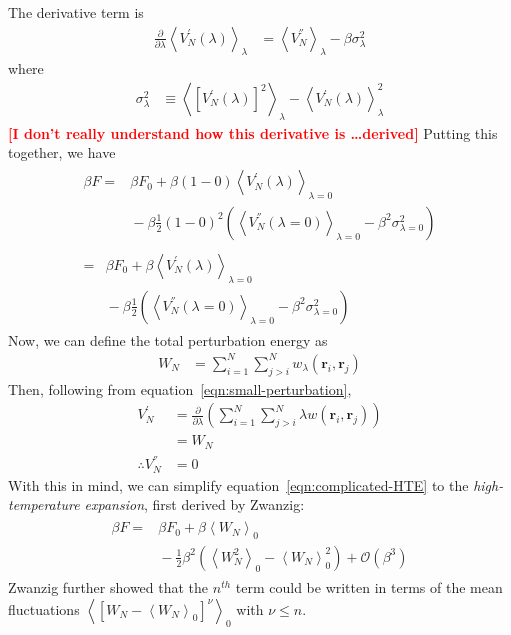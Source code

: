 \documentclass[letterpaper,twocolumn,amsmath,amssymb,prb]{revtex4-1}
\newcommand{\1}{\ensuremath{\textbf{r}_1}}
\newcommand{\2}{\ensuremath{\textbf{r}_2}}
\newcommand{\3}{\ensuremath{\textbf{r}_3}}
\newcommand{\4}{\ensuremath{\textbf{r}_4}}
\newcommand{\fixme}[1]{\textcolor{red}{\textbf{[#1]}}}
\begin{document}
The derivative term is
\begin{align}
  \frac{\partial}{\partial\lambda}\left\langle V_N^{'}(\lambda) \right\rangle_{\lambda} &= \left\langle V_N^{''} \right\rangle_\lambda - \beta\sigma_\lambda^2
\end{align}
where
\begin{align}
  \sigma_\lambda^2 &\equiv \left\langle \left[ V_N^{'}(\lambda) \right]^2 \right\rangle_\lambda - \left\langle V_N^{'}(\lambda) \right\rangle^2_\lambda
\end{align}
\fixme{I don't really understand how this derivative is \ldots derived}
Putting this together, we have
\begin{align}
  \begin{split}
    \beta F = &{} \beta F_0 + \beta(1 - 0)\left\langle V_N^{'}(\lambda) \right\rangle_{\lambda = 0} \\ &{} - \beta\frac{1}{2}(1 - 0)^2\left(\left\langle V_N^{''}(\lambda = 0) \right\rangle_{\lambda = 0} - \beta^2\sigma^2_{\lambda = 0} \right)
  \end{split} \\
  \begin{split}
    =&{}  \beta F_0 + \beta\left\langle V_N^{'}(\lambda) \right\rangle_{\lambda = 0} \\ &{} - \beta\frac{1}{2}\left(\left\langle V_N^{''}(\lambda = 0) \right\rangle_{\lambda = 0} - \beta^2\sigma^2_{\lambda = 0} \right) \label{eqn:complicated-HTE}
  \end{split}
\end{align}
Now, we can define the total perturbation energy as
\begin{align}
  W_N &= \sum_{i=1}^N\sum_{j>i}^N w_\lambda(\mathbf{r}_i,\mathbf{r}_j)
\end{align}
Then, following from equation~\ref{eqn:small-perturbation},
\begin{align}
  V_N^{'} &= \frac{\partial}{\partial\lambda}\left(\sum_{i=1}^N\sum_{j>i}^N \lambda w(\mathbf{r}_i,\mathbf{r}_j)\right) \nonumber \\
  &= W_N \\
  \therefore V_N^{''} &= 0
\end{align}
With this in mind, we can simplify equation~\ref{eqn:complicated-HTE} to the \emph{high-temperature expansion}, first derived by Zwanzig:\cite{Zwanzig54}
\begin{align}
  \begin{split}
    \beta F = &{} \beta F_0 + \beta\left\langle W_N \right\rangle_0  \\ &{} - \frac{1}{2}\beta^2\left( \left\langle W_N^2 \right\rangle_0 - \left\langle W_N \right\rangle_0^2 \right) + \mathcal{O}(\beta^3)
  \end{split}
\end{align}
Zwanzig further showed that the $n^{th}$ term could be written in terms of the mean fluctuations $\left\langle \left[ W_N - \left\langle W_N\right\rangle_0 \right]^\nu \right\rangle_0$ with $\nu \leq n$.
\end{document}

